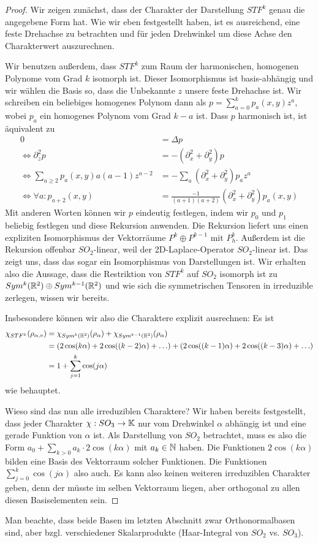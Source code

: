 \begin{proof}
Wir zeigen zunächst, dass der Charakter der Darstellung $STF^k$ genau die angegebene Form hat. Wie wir eben festgestellt haben, ist es ausreichend, eine feste Drehachse zu betrachten und für jeden Drehwinkel um diese Achse den Charakterwert auszurechnen.

Wir benutzen außerdem, dass $STF^k$ zum Raum der harmonischen, homogenen Polynome vom Grad $k$ isomorph ist. Dieser Isomorphismus ist basis-abhängig und wir wählen die Basis so, dass die Unbekannte $z$ unsere feste Drehachse ist. Wir schreiben ein beliebiges homogenes Polynom dann als $p = \sum_{a=0}^k p_a(x,y)z^a$, wobei $p_a$ ein homogenes Polynom vom Grad $k-a$ ist. Dass $p$ harmonisch ist, ist äquivalent zu
\begin{align*}
0 &= \Delta p \\
\iff \partial_z^2 p &= -(\partial_x^2+\partial_y^2)p \\
\iff \sum_{a\geq 2} p_a(x,y) a(a-1)z^{a-2} &= -\sum_a (\partial_x^2+\partial_y^2)p_a z^a \\
\iff \forall a: p_{a+2}(x,y) &= \frac{-1}{(a+1)(a+2)}(\partial_x^2+\partial_y^2)p_a(x,y)
\end{align*}
Mit anderen Worten können wir $p$ eindeutig festlegen, indem wir $p_0$ und $p_1$ beliebig festlegen und diese Rekursion anwenden. Die Rekursion liefert uns einen expliziten Isomorphismus der Vektorräume $P^{k}\oplus P^{k-1}$ mit $P_h^k$. Außerdem ist die Rekursion offenbar $SO_2$-linear, weil der 2D-Laplace-Operator $SO_2$-linear ist. Das zeigt uns, dass das sogar ein Isomorphismus von Darstellungen ist. Wir erhalten also die Aussage, dass die Restriktion von $STF^k$ auf $SO_2$ isomorph ist zu $Sym^k(\mathbb{R}^2)\oplus Sym^{k-1}(\mathbb{R}^2)$ und wie sich die symmetrischen Tensoren in irreduzible zerlegen, wissen wir bereits.

Insbesondere können wir also die Charaktere explizit ausrechnen: Es ist
\begin{align*}
    \chi_{STF^k}(\rho_{\alpha,v}) &= \chi_{Sym^k(\mathbb{R}^2)}(\rho_\alpha) + \chi_{Sym^{k-1}(\mathbb{R}^2)}(\rho_\alpha) \\
    &= (2\cos(k\alpha)+2\cos((k-2)\alpha)+\ldots)+(2\cos((k-1)\alpha)+2\cos((k-3)\alpha) +\ldots) \\
    &= 1+\sum_{j=1}^k \cos(j\alpha)
\end{align*}
wie behauptet.

\medbreak
Wieso sind das nun alle irreduziblen Charaktere? Wir haben bereits festgestellt, dass jeder Charakter $\chi: SO_3\to\mathbb{K}$ nur vom Drehwinkel $\alpha$ abhängig ist und eine gerade Funktion von $\alpha$ ist. Als Darstellung von $SO_2$ betrachtet, muss es also die Form $a_0 + \sum_{k>0} a_k\cdot 2\cos(k\alpha)$ mit $a_k\in\mathbb{N}$ haben. Die Funktionen $2\cos(k\alpha)$ bilden eine Basis des Vektorraum solcher Funktionen. Die Funktionen $\sum_{j=0}^k \cos(j\alpha)$ also auch. Es kann also keinen weiteren irreduziblen Charakter geben, denn der müsste im selben Vektorraum liegen, aber orthogonal zu allen diesen Basiselementen sein.
\end{proof}

\begin{remark}
Man beachte, dass beide Basen im letzten Abschnitt zwar Orthonormalbasen sind, aber bzgl. verschiedener Skalarprodukte (Haar-Integral von $SO_2$ vs. $SO_3$).
\end{remark}
